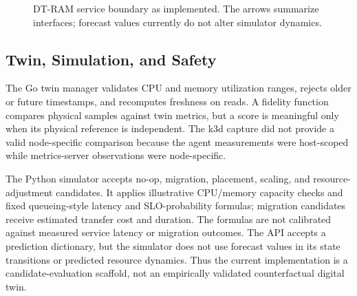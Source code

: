 \documentclass[conference]{IEEEtran}
\begin{document}
\begin{figure}[t]
\centering
{}
\caption{DT-RAM service boundary as implemented. The arrows summarize interfaces; forecast values currently do not alter simulator dynamics.}
\label{fig:architecture}
\end{figure}

\subsection{Twin, Simulation, and Safety}
The Go twin manager validates CPU and memory utilization ranges, rejects older or future timestamps, and recomputes freshness on reads. A fidelity function compares physical samples against twin metrics, but a score is meaningful only when its physical reference is independent. The k3d capture did not provide a valid node-specific comparison because the agent measurements were host-scoped while metrics-server observations were node-specific.

The Python simulator accepts no-op, migration, placement, scaling, and resource-adjustment candidates. It applies illustrative CPU/memory capacity checks and fixed queueing-style latency and SLO-probability formulas; migration candidates receive estimated transfer cost and duration. The formulas are not calibrated against measured service latency or migration outcomes. The API accepts a prediction dictionary, but the simulator does not use forecast values in its state transitions or predicted resource dynamics. Thus the current implementation is a candidate-evaluation scaffold, not an empirically validated counterfactual digital twin.
\end{document}
